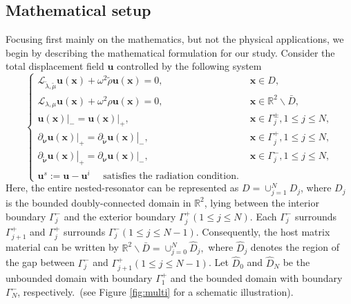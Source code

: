\documentclass[10pt,reqno,oneside]{amsart}%
\theoremstyle{definition}
\theoremstyle{remark}
\numberwithin{equation}{section}
\numberwithin{equation}{section}
\begin{document}
\subsection{Mathematical setup}
Focusing first mainly on the mathematics, but not the physical applications, we begin by describing the mathematical formulation for our study. Consider the total displacement field $\mathbf{u}$ controlled by the following system
\begin{equation}\label{Lame system2}
\begin{cases}
\mathcal{L}_{\tilde{\lambda}, \tilde{\mu}} \mathbf{u}(\mathbf{x})+\omega^{2} \tilde{\rho} \mathbf{u}(\mathbf{x})=0, & \mathbf{x} \in {D}, \\ \mathcal{L}_{\lambda, \mu} \mathbf{u}(\mathbf{x})+\omega^{2} \rho \mathbf{u}(\mathbf{x})=0, & \mathbf{x} \in \mathbb{R}^{2} \backslash \bar{D}, \\ \left.\mathbf{u}(\mathbf{x})\right|_{-}=\left.\mathbf{u}(\mathbf{x})\right|_{+}, & \mathbf{x} \in \Gamma_j^{\pm},1\leq j\leq N, \\ \left.\partial_{\boldsymbol{\nu}} \mathbf{u}(\mathbf{x})\right|_{+}=\left. \partial_{\tilde{\boldsymbol{\nu}}} \mathbf{u}(\mathbf{x})\right|_{-},& \mathbf{x} \in \Gamma_j^{+},1\leq j\leq N, \\
\left.\partial_{\tilde{\boldsymbol{\nu}}} \mathbf{u}(\mathbf{x})\right|_{+}=\left.\partial_{\boldsymbol{\nu}} \mathbf{u}(\mathbf{x})\right|_{-}, & \mathbf{x} \in \Gamma_j^{-},1\leq j\leq N, \\
\mathbf{u}^{s}:=\mathbf{u}-\mathbf{u}^{i} \quad \text { satisfies the radiation condition. } &
\end{cases}
\end{equation}
Here, the entire nested-resonator can be represented as ${D}=\cup_{j=1}^N{D}_j$, where ${D}_j$ is the bounded doubly-connected domain in $\mathbb{R}^{2}$, lying between the interior boundary $\Gamma_j^-$ and the exterior boundary $\Gamma_j^+(1\leq j\leq N)$. Each $\Gamma_j^-$ surrounds $\Gamma_{j+1}^+$ and $\Gamma_j^+$ surrounds $\Gamma_j^-(1\leq j\leq N-1)$. Consequently, the host matrix material can be written by $\mathbb{R}^2\backslash \bar{D}=\cup_{j=0}^N\hat{D}_j,$ where $\hat{D}_j$ denotes the region of the gap between $\Gamma_j^{-}$ and $\Gamma_{j+1}^{+}(1\leq j\leq N-1)$. Let $\hat{D}_0$ and $\hat{D}_N$ be the unbounded domain with boundary $\Gamma_{1}^{+}$ and the bounded domain with boundary $\Gamma_N^-$, respectively.~(see Figure \ref{fig:multi} for a schematic illustration).
\end{document}
